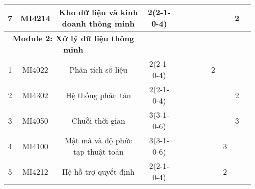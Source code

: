 \documentclass[12pt,a4paper]{report}
\begin{document}
\begin{landscape}
\begin{longtable}[c]{|c|c|c|c|c|c|c|c|c|c|c|c|}
        7                             & MI4214                          & Kho dữ liệu và kinh doanh thông minh                         & 2(2-1-0-4)                                                                           &             &             &             &             &             &             & 2           &             \\ \hline
        \multicolumn{3}{|c|}{\textbf{Module 2: Xử lý dữ liệu thông minh}}                                                              &                                                                                      &             &             &             &             &             &             &             &             \\ \hline
        1                             & MI4022                          & Phân tích số liệu                                            & 2(2-1-0-4)                                                                           &             &             &             &             & 2           &             &             &             \\ \hline
        2                             & MI4302                          & Hệ thống phân tán                                            & 2(2-1-0-4)                                                                           &             &             &             &             &             &             & 2           &             \\ \hline
        3                             & MI4050                          & Chuỗi thời gian                                              & 3(3-1-0-6)                                                                           &             &             &             &             &             &             & 3           &             \\ \hline
        4                             & MI4100                          & Mật mã và độ phức tạp thuật toán                             & 3(3-1-0-6)                                                                           &             &             &             &             &             & 3           &             &             \\ \hline
        5                             & MI4212                          & Hệ hỗ trợ quyết định                                         & 2(2-1-0-4)                                                                           &             &             &             &             &             & 2           &             &             \\ \hline

\end{longtable}
\end{landscape}
\end{document}
